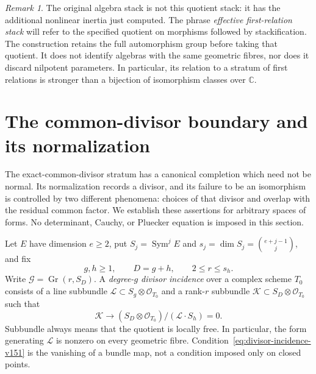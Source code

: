 \documentclass[11pt,reqno]{amsart}
\numberwithin{equation}{section}
\theoremstyle{definition}\newtheorem{definition}[theorem]{Definition}
\theoremstyle{remark}\newtheorem{remark}[theorem]{Remark}
\newcommand{\C}{\mathbb C}\newcommand{\Q}{\mathbb Q}
\newcommand{\OO}{\mathcal O}\newcommand{\II}{\mathcal I}
\DeclareMathOperator{\Sym}{Sym}\DeclareMathOperator{\Gr}{Gr}
\begin{document}
\begin{remark}\label{rem:algebra-inertia}
The original algebra stack is not this quotient stack: it has the
additional nonlinear inertia just computed.  The phrase
\emph{effective first-relation stack} will refer to the specified
quotient on morphisms followed by stackification.  The construction
retains the full automorphism group before taking that quotient.
It does not identify algebras with the same geometric fibres, nor
does it discard nilpotent parameters.  In particular, its relation
to a stratum of first relations is stronger than a bijection of
isomorphism classes over \(\C\).
\end{remark}


\section{The common-divisor boundary and its normalization}
\label{sec:canonical-boundary-v151}

The exact-common-divisor stratum has a canonical completion which need
not be normal.  Its normalization records a divisor, and its failure to
be an isomorphism is controlled by two different phenomena: choices of
that divisor and overlap with the residual common factor.  We establish
these assertions for arbitrary spaces of forms.  No determinant, Cauchy,
or Pluecker equation is imposed in this section.

Let \(E\) have dimension \(e\geq2\), put \(S_j=\Sym^j E\) and
\(s_j=\dim S_j=\binom{e+j-1}{j}\), and fix
\[
             g,h\geq1,\qquad D=g+h,\qquad 2\leq r\leq s_h.
\]
Write \(\mathscr G=\Gr(r,S_D)\).  A \emph{degree-\(g\) divisor
incidence} over a complex scheme \(T_0\) consists of a line subbundle
\(\mathcal L\subset S_g\otimes\OO_{T_0}\) and a rank-\(r\)
subbundle \(\mathcal K\subset S_D\otimes\OO_{T_0}\) such that
\begin{equation}\label{eq:divisor-incidence-v151}
 \mathcal K\longrightarrow
 (S_D\otimes\OO_{T_0})/(\mathcal L\cdot S_h)=0.
\end{equation}
Subbundle always means that the quotient is locally free.  In
particular, the form generating \(\mathcal L\) is nonzero on every
geometric fibre.  Condition~\eqref{eq:divisor-incidence-v151} is the
vanishing of a bundle map, not a condition imposed only on closed points.
\end{document}
